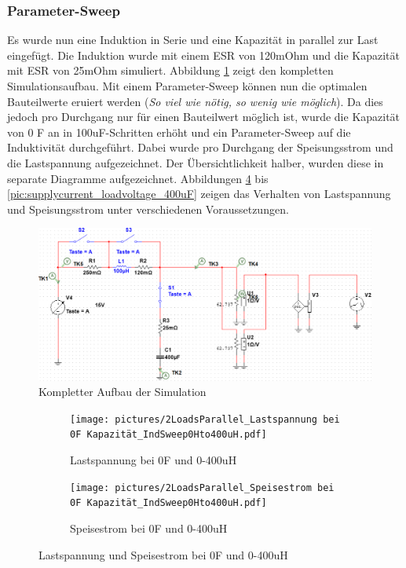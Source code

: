 \subsubsection{Parameter-Sweep}
Es wurde nun eine Induktion in Serie und eine Kapazität in parallel zur Last eingefügt. Die Induktion wurde mit einem ESR von 120mOhm und die Kapazität mit ESR von 25mOhm simuliert. Abbildung \ref{pic:simulation_complete} zeigt den kompletten Simulationsaufbau. Mit einem Parameter-Sweep können nun die optimalen Bauteilwerte eruiert werden (\textit{So viel wie nötig, so wenig wie möglich}). Da dies jedoch pro Durchgang nur für einen Bauteilwert möglich ist, wurde die Kapazität von 0 F an in 100uF-Schritten erhöht und ein Parameter-Sweep auf die Induktivität durchgeführt. Dabei wurde pro Durchgang der Speisungsstrom und die Lastspannung aufgezeichnet. Der Übersichtlichkeit halber, wurden diese in separate Diagramme aufgezeichnet. Abbildungen \ref{pic:supplycurrent_loadvoltage_0F} bis \ref{pic:supplycurrent_loadvoltage_400uF} zeigen das Verhalten von Lastspannung und Speisungsstrom unter verschiedenen Voraussetzungen.
\begin{figure}[H]
	\centering
	\includegraphics[width=\textwidth*6/8]{pictures/simu_cap_sweep_schematic.png}
	\caption{Kompletter Aufbau der Simulation}
	\label{pic:simulation_complete}
\end{figure}
\begin{figure}[H]
	\centering
	\begin{subfigure}{/13}
		\centering
		\texttt{[image: pictures/2LoadsParallel\_Lastspannung bei 0F Kapazität\_IndSweep0Hto400uH.pdf]}
		\caption{Lastspannung bei 0F und 0-400uH}
		\label{pic:loadvoltage_0F}
	\end{subfigure}
	\hfill
	\begin{subfigure}{/13}
		\centering
		\texttt{[image: pictures/2LoadsParallel\_Speisestrom bei 0F Kapazität\_IndSweep0Hto400uH.pdf]}
		\caption{Speisestrom bei 0F und 0-400uH}
		\label{pic:supplycurrent_0F}
	\end{subfigure}
	\caption{Lastspannung und Speisestrom bei 0F und 0-400uH}
	\label{pic:supplycurrent_loadvoltage_0F}
\end{figure}
